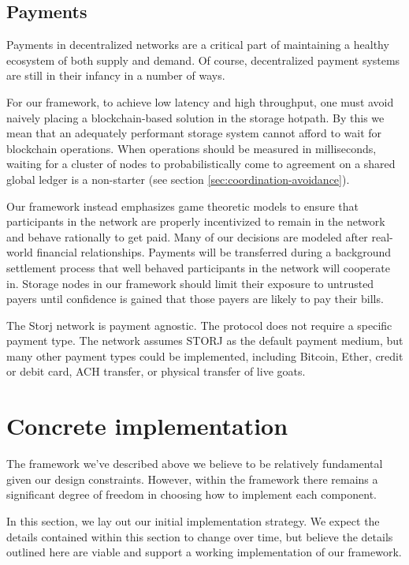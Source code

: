 \documentclass[11pt,fleqn,openany]{book}
\begin{document}
\section{Payments}

Payments in decentralized networks are a critical part of maintaining a healthy
ecosystem of both supply and demand. Of course, decentralized payment systems
are still in their infancy in a number of ways.

For our framework, to achieve low latency and high throughput, one must
avoid naively placing a blockchain-based solution in the storage hotpath.
By this we mean that an adequately performant storage system cannot afford to
wait for blockchain operations. When operations should be measured in
milliseconds, waiting for a cluster of nodes to probabilistically come to
agreement on a shared global ledger is a non-starter
(see section \ref{sec:coordination-avoidance}).

Our framework instead emphasizes game theoretic models to ensure
that participants in the network are properly incentivized to remain in the
network and behave rationally to get paid.
Many of our decisions are modeled after real-world financial relationships.
Payments will be transferred during
a background settlement process that well behaved participants in the network
will cooperate in. Storage nodes in our framework should limit their exposure
to untrusted payers until confidence is gained that those payers are likely
to pay their bills.

The Storj network is payment agnostic.
The protocol does not require a specific payment type.
The network assumes STORJ as the default payment medium, but many other payment
types could be implemented, including Bitcoin, Ether, credit or debit card,
ACH transfer, or physical transfer of live goats.

\chapter{Concrete implementation}\label{chap:concrete}

The framework we've described above we believe to be relatively fundamental
given our design constraints. However, within the framework there remains a
significant degree of freedom in choosing how to implement each component.

In this section, we lay out our initial implementation strategy. We expect
the details contained within this section to change over time, but believe the
details outlined here are viable and support a working implementation of our
framework.
\end{document}
